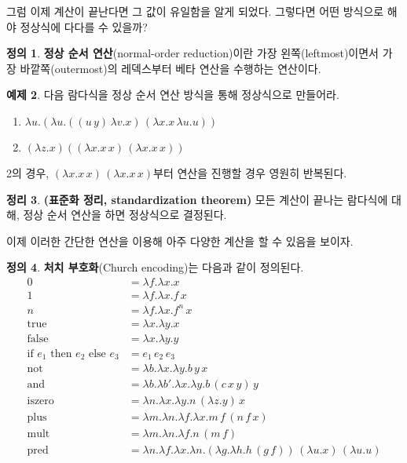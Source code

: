 \documentclass[b5paper, 10pt]{book}
\theoremstyle{definition}
\newtheorem{defn}{정의}[chapter]
\newtheorem{thm}[defn]{정리}
\newtheorem{ex}[defn]{예제}
\begin{document}
그럼 이제 계산이 끝난다면 그 값이 유일함을 알게 되었다. 그렇다면 어떤 방식으로 해야 정상식에
다다를 수 있을까?
\begin{defn}
    \textbf{정상 순서 연산}(normal-order reduction)이란 가장 왼쪽(leftmost)이면서 가장 
    바깥쪽(outermost)의 레덱스부터 베타 연산을 수행하는 연산이다.
\end{defn}
\begin{ex}
    다음 람다식을 정상 순서 연산 방식을 통해 정상식으로 만들어라.
    \begin{enumerate}
        \item $\lambda u. (\lambda u. ((u \, y) \, \lambda v. x) \, (\lambda x. x \, \lambda u. u))$
        \item $(\lambda z. x) ((\lambda x . x \, x) \, (\lambda x. x \, x))$
    \end{enumerate}
    2의 경우, $(\lambda x . x \, x) \, (\lambda x. x \, x)$부터 연산을 진행할 경우 영원히 반복된다.
\end{ex}
\begin{thm}
    \textbf{(표준화 정리, standardization theorem)} 모든 계산이 끝나는 람다식에 대해, 
    정상 순서 연산을 하면 정상식으로 결정된다.
\end{thm}
이제 이러한 간단한 연산을 이용해 아주 다양한 계산을 할 수 있음을 보이자.
\begin{defn}
    \textbf{처치 부호화}(Church encoding)는 다음과 같이 정의된다.
    \begin{align*}
        0 &= \lambda f. \lambda x. x \\ 
        1 &= \lambda f. \lambda x. f \, x  \\ 
        n &= \lambda f. \lambda x. f^n \, x \\
        \text{true} &= \lambda x. \lambda y. x \\ 
        \text{false} &= \lambda x. \lambda y. y \\ 
        \text{if } e_1 \text{ then } e_2 \text { else } e_3 &=
        e_1 \, e_2 \, e_3 \\ 
        \text{not} &= \lambda b. \lambda x. \lambda y. b \, y \, x \\ 
        \text{and} &= \lambda b. \lambda b'. \lambda x. \lambda y.
        b \, (c \, x \, y) \, y\\
        \text{iszero} &= \lambda n. \lambda x. \lambda y. n \, (\lambda z. y) \, x \\
        \text{plus} &= \lambda m. \lambda n. \lambda f. \lambda x. m \, f \, (n\, f\, x) \\
        \text{mult} &= \lambda m. \lambda n. \lambda f. n \, (m \, f)  \\ 
        \text{pred} &= \lambda n. \lambda f. \lambda x. \lambda n. (\lambda g. \lambda h.
        h \, (g \, f)) \, (\lambda u. x) \, (\lambda u. u)
    \end{align*}
\end{defn}
\end{document}
